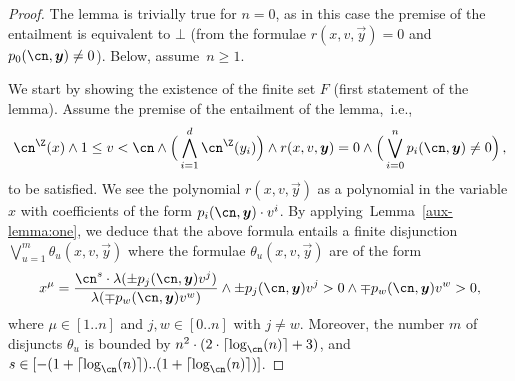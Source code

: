   \begin{proof}
    The lemma is trivially true for $n = 0$,
    as in this case the premise of the entailment is equivalent to $\bot$
    (from the formulae $r(x,v,\vec y)=0$ and 
    $p_0(\cn,\vec y) \neq 0$). Below, assume~$n \geq 1$.
  
    We start by showing the existence of the finite set $F$ (first statement of the lemma).
    Assume the premise of the entailment 
    of the lemma,~i.e., 
    \begin{equation}
      \label{last-lambda-antecedent}
      \ipow{\cn}(x) 
        \land 1 \leq v < \cn 
        \land \Big(\bigwedge_{i=1}^d \ipow{\cn}(y_i)\Big)
        \land r(x,v,\vec y)=0 
        \land \Big(\bigvee_{i=0}^n p_i(\cn,\vec y) \neq 0\Big)\,,
    \end{equation}
    to be satisfied. 
    We see the polynomial $r(x,v,\vec y)$ 
    as a polynomial in the 
    variable $x$ with coefficients of the form $p_i(\cn,\vec y) \cdot v^i$.
    By applying~Lemma~\ref{aux-lemma:one}, 
    we deduce that the above formula
    entails a finite disjunction $\bigvee_{u=1}^m \theta_u(x,v,\vec y)$ 
    where the formulae $\theta_u(x,v,\vec y)$ are of the form 
    \begin{equation}\label{last-lambda-eq1}
      x^\mu=\frac{\cn^s\cdot \lambda(\pm p_j(\cn,\vec y)v^j)}
      {\lambda(\mp p_w(\cn,\vec y)v^{w})}
      \land \pm p_j(\cn,\vec y)v^j > 0 
      \land \mp p_w(\cn,\vec y)v^w > 0,
    \end{equation}
    where $\mu\in[1..n]$ and $j,w \in [0..n]$ with $j\neq w$.
    Moreover, the number $m$ of disjuncts $\theta_u$ is bounded 
    by $n^2\cdot (2 \cdot \ceil{\log_{\cn}(n)} + 3)$, 
    and $s \in [-(1+\ceil{\log_{\cn}(n)})..(1+\ceil{\log_{\cn}(n)})]$.
  

\end{proof}
